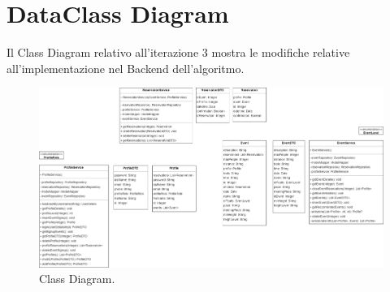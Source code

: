 \section{DataClass Diagram} 
Il Class Diagram relativo all'iterazione 3 mostra le modifiche relative all'implementazione nel Backend dell'algoritmo.
\begin{figure}[h!]
	\centering
	\includegraphics[width=0.8\linewidth]{images/class.drawio.png}
	\caption{Class Diagram.}
	\label{fig:ClassDiagram}
\end{figure}

